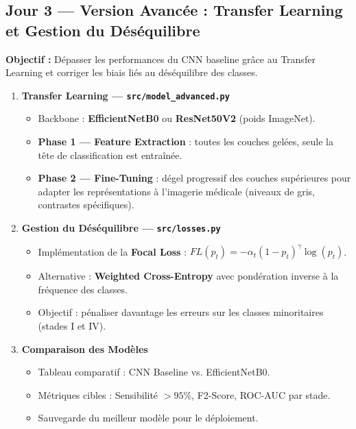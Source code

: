 \documentclass[12pt,a4paper]{article}
\begin{document}
\subsection{Jour 3 — Version Avancée : Transfer Learning et Gestion du Déséquilibre}

\begin{daybox}
\textbf{Objectif :} Dépasser les performances du CNN baseline grâce au Transfer Learning et corriger les biais liés au déséquilibre des classes.
\end{daybox}

\vspace{0.4cm}

\begin{enumerate}[label=\textbf{Étape \arabic*.}, leftmargin=2.5cm, itemsep=0.4cm, start=9]

  \item \textbf{Transfer Learning — \texttt{src/model\_advanced.py}}
  \begin{itemize}
    \item Backbone : \textbf{EfficientNetB0} ou \textbf{ResNet50V2} (poids ImageNet).
    \item \textbf{Phase 1 — Feature Extraction} : toutes les couches gelées, seule la tête de classification est entraînée.
    \item \textbf{Phase 2 — Fine-Tuning} : dégel progressif des couches supérieures pour adapter les représentations à l'imagerie médicale (niveaux de gris, contrastes spécifiques).
  \end{itemize}

  \item \textbf{Gestion du Déséquilibre — \texttt{src/losses.py}}
  \begin{itemize}
    \item Implémentation de la \textbf{Focal Loss} : $FL(p_t) = -\alpha_t (1 - p_t)^\gamma \log(p_t)$.
    \item Alternative : \textbf{Weighted Cross-Entropy} avec pondération inverse à la fréquence des classes.
    \item Objectif : pénaliser davantage les erreurs sur les classes minoritaires (stades I et IV).
  \end{itemize}

  \item \textbf{Comparaison des Modèles}
  \begin{itemize}
    \item Tableau comparatif : CNN Baseline vs. EfficientNetB0.
    \item Métriques cibles : Sensibilité $> 95\%$, F2-Score, ROC-AUC par stade.
    \item Sauvegarde du meilleur modèle pour le déploiement.
  \end{itemize}

\end{enumerate}
\end{document}

